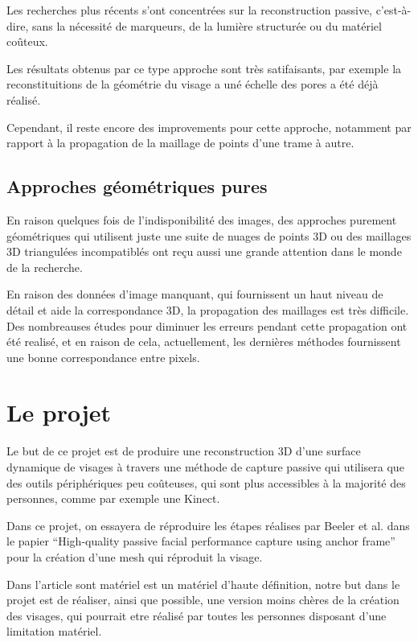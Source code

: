 \documentclass[a4paper,12pt]{article}
\begin{document}
Les recherches plus récents s'ont concentrées sur la reconstruction
passive, c'est-à-dire, sans la nécessité de marqueurs, de la lumière
structurée ou du matériel coûteux. 

Les résultats obtenus par ce type approche sont très satifaisants, par
exemple la reconstituitions de la géométrie du visage a uné échelle
des pores a été déjà réalisé. 
 
Cependant, il reste encore des improvements pour cette approche,
notamment par rapport à la propagation de la maillage de points d'une
trame à autre. 

\subsection*{Approches géométriques pures}

En raison quelques fois de l'indisponibilité des images, des approches purement
géométriques qui utilisent juste une suite de nuages de points 3D ou
des maillages 3D triangulées incompatiblés ont reçu aussi une grande attention
dans le monde de la recherche.

En raison des données d'image manquant, qui fournissent un haut niveau
de détail et aide la correspondance 3D, la propagation des maillages 
est très difficile. Des nombreauses études pour diminuer les erreurs
pendant cette propagation ont été realisé, et en raison de cela,
actuellement, les dernières méthodes fournissent une bonne
correspondance entre pixels. %

\section{Le projet}

Le but de ce projet est de produire une reconstruction 3D d'une
surface dynamique de visages à travers une méthode de capture passive
qui utilisera que des outils périphériques peu coûteuses, qui sont
plus accessibles à la majorité des personnes, comme par exemple une Kinect.

Dans ce projet, on essayera de réproduire les étapes réalises par
Beeler et al. dans le papier ``High-quality passive facial performance
capture using anchor frame''\cite{Beeler:2011:HPF:2010324.1964970}
pour la création d'une mesh qui réproduit la visage. 

Dans l'article sont matériel est un matériel d'haute définition, notre
but dans le projet est de réaliser, ainsi que possible, une version
moins chères de la création des visages, qui pourrait etre réalisé par
toutes les personnes disposant d'une limitation matériel. 
\end{document}
